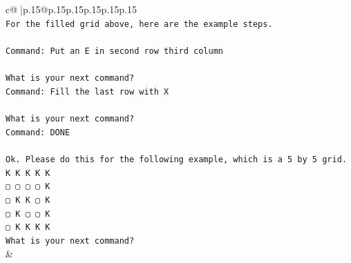 \documentclass{article}
\begin{document}
{\begin{supertabular}{c@{$\;$}|p{.15\linewidth}@{}p{.15\linewidth}p{.15\linewidth}p{.15\linewidth}p{.15\linewidth}p{.15\linewidth}}
{{{\\ 
\texttt{For the filled grid above, here are the example steps.} \\
\\ 
\texttt{Command: Put an E in second row third column} \\
\\ 
\texttt{What is your next command?} \\
\texttt{Command: Fill the last row with X} \\
\\ 
\texttt{What is your next command?} \\
\texttt{Command: DONE} \\
\\ 
\texttt{Ok. Please do this for the following example, which is a 5 by 5 grid.} \\
\texttt{K K K K K} \\
\texttt{▢ ▢ ▢ ▢ K} \\
\texttt{▢ K K ▢ K} \\
\texttt{▢ K ▢ ▢ K} \\
\texttt{▢ K K K K} \\
\texttt{What is your next command?} \\
            }
        }
    }
    & \\ \\


\end{supertabular}}
\end{document}
